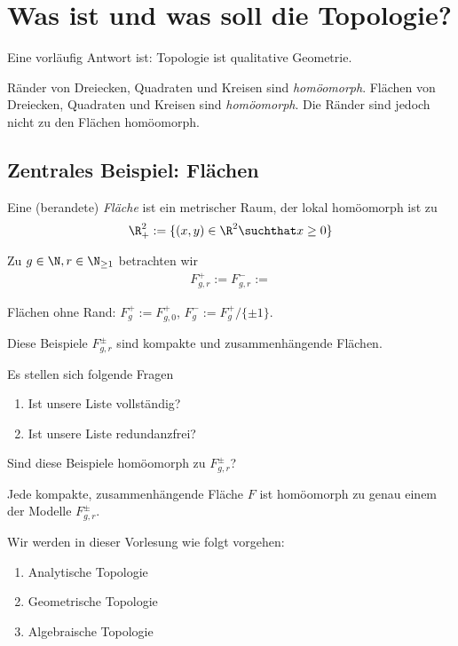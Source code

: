 \chapter{Was ist und was soll die Topologie?}

Eine vorläufig Antwort ist:
Topologie ist qualitative Geometrie.

\begin{ex}
	Ränder von Dreiecken, Quadraten und Kreisen sind \emph{homöomorph}.
	Flächen von Dreiecken, Quadraten und Kreisen sind \emph{homöomorph}.
	Die Ränder sind jedoch nicht zu den Flächen homöomorph.
\end{ex}


\section{Zentrales Beispiel: Flächen}


\begin{df}
	Eine (berandete) \emph{Fläche} ist ein metrischer Raum, der lokal homöomorph ist zu
	\[
		\R^2_+ := \{ (x,y) \in \R^2 \suchthat x \ge 0 \}
	\]
\end{df}

\begin{ex}
	Zu $g \in \N, r \in \N_{\ge 1}$ betrachten wir
	\begin{align*}
		F_{g,r}^+ := %
		F_{g,r}^- := %
	\end{align*}

	Flächen ohne Rand: $F_g^+ := F_{g,0}^+$, $F_g^- := F_g^+ / \{\pm 1\}$.

	Diese Beispiele $F_{g,r}^{\pm}$ sind kompakte und zusammenhängende Flächen.

	Es stellen sich folgende Fragen
	\begin{enumerate}[1)]
		\item
			Ist unsere Liste vollständig?
		\item
			Ist unsere Liste redundanzfrei?
	\end{enumerate}
\end{ex}

\begin{ex}
	Sind diese Beispiele homöomorph zu $F_{g,r}^{\pm}$?
\end{ex}

\begin{st}
	Jede kompakte, zusammenhängende Fläche $F$ ist homöomorph zu genau einem der Modelle $F_{g,r}^\pm$.
\end{st}

Wir werden in dieser Vorlesung wie folgt vorgehen:

\begin{enumerate}[1.]
	\item
		Analytische Topologie
	\item
		Geometrische Topologie
	\item
		Algebraische Topologie
\end{enumerate}
